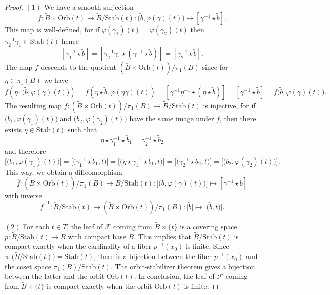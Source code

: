 \documentclass[11pt, letterpaper, oneside,reqno]{amsart}
\theoremstyle{plain}
\theoremstyle{underline}
\theoremstyle{definition}
\theoremstyle{remark}
\begin{document}
	\begin{proof}
		$(1)$ We have a smooth surjection
		\[
		f:\widetilde{B}\times \text{Orb}(t)\rightarrow \widetilde{B}/\text{Stab}(t):\big(\tilde{b},\varphi(\gamma)(t)\big)\mapsto [\gamma^{-1}\star\tilde{b}].
		\]
		This map is well-defined, for if $\varphi(\gamma_1)(t)=\varphi(\gamma_2)(t)$ then $\gamma_2^{-1}\gamma_1\in\text{Stab}(t)$ hence 
		$$
		[\gamma_1^{-1}\star\tilde{b}]=[\gamma_2^{-1}\gamma_1\star(\gamma^{-1}\star\tilde{b})]=[\gamma_2^{-1}\star\tilde{b}].
		$$
		The map $f$ descends to the quotient $(\widetilde{B}\times \text{Orb}(t))/\pi_1(B)$ since for $\eta\in\pi_1(B)$ we have
		\[
		f\left(\eta\cdot\big(\tilde{b},\varphi(\gamma)(t)\big)\right)=f\left(\eta\star\tilde{b},\varphi(\eta\gamma)(t)\right)=[\gamma^{-1}\eta^{-1}\star(\eta\star\tilde{b})]=[\gamma^{-1}\star\tilde{b}]=f\big(\tilde{b},\varphi(\gamma)(t)\big).
		\]
		The resulting map $\overline{f}:(\widetilde{B}\times \text{Orb}(t))/\pi_1(B)\rightarrow\widetilde{B}/\text{Stab}(t)$ is injective, for if $\big(\tilde{b}_1,\varphi(\gamma_1)(t)\big)$ and $\big(\tilde{b}_2,\varphi(\gamma_2)(t)\big)$ have the same image under $f$, then there exists $\eta\in\text{Stab}(t)$ such that
		\[
		\eta\star\gamma_1^{-1}\star\tilde{b}_1=\gamma_2^{-1}\star\tilde{b}_2
		\]
		and therefore
		\[
		\big[\big(\tilde{b}_1,\varphi(\gamma_1)(t)\big)\big]=\big[\big(\gamma_1^{-1}\star\tilde{b}_1,t\big)\big]=\big[\big(\eta\star\gamma_1^{-1}\star\tilde{b}_1,t\big)\big]=\big[\big(\gamma_2^{-1}\star\tilde{b}_2,t\big)\big]=\big[\big(\tilde{b}_2,\varphi(\gamma_2)(t)\big)\big].
		\]
		This way, we obtain a diffeomorphism
		\[
		\overline{f}:(\widetilde{B}\times \text{Orb}(t))/\pi_1(B)\rightarrow\widetilde{B}/\text{Stab}(t):\big[\big(\tilde{b},\varphi(\gamma)(t)\big)\big]\mapsto[\gamma^{-1}\star\tilde{b}]
		\]
		with inverse
		\[
		\overline{f}^{-1}:\widetilde{B}/\text{Stab}(t)\rightarrow(\widetilde{B}\times \text{Orb}(t))/\pi_1(B):\big[\tilde{b}\big]\mapsto\big[\big(\tilde{b},t\big)\big].
		\]
		
		$(2)$ For each $t\in T$, the leaf of $\mathcal{F}$ coming from $\widetilde{B}\times\{t\}$ is a covering space $p:\widetilde{B}/\text{Stab}(t)\rightarrow B$  with compact base $B$. This implies that $\widetilde{B}/\text{Stab}(t)$ is compact exactly when the cardinality of a fiber $p^{-1}(x_0)$ is finite. Since $\pi_1\big(\widetilde{B}/\text{Stab}(t)\big)=\text{Stab}(t)$, there is a bijection between the fiber $p^{-1}(x_0)$ and the coset space $\pi_1(B)/\text{Stab}(t)$. The orbit-stabilizer theorem gives a bijection between the latter and the orbit $\text{Orb}(t)$. In conclusion, the leaf of $\mathcal{F}$ coming from $\widetilde{B}\times\{t\}$ is compact exactly when the orbit $\text{Orb}(t)$ is finite.
		

\end{proof}
\end{document}
